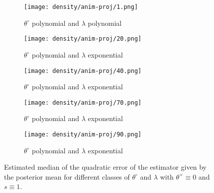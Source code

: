 \begin{figure}
\centering
\begin{subfigure}{.4\textwidth}
  \centering
  \texttt{[image: density/anim-proj/1.png]}
  \caption{$\theta^{\circ}$ polynomial and $\lambda$ polynomial}
  \label{fig3:sub1}
\end{subfigure}%
\begin{subfigure}{.4\textwidth}
  \centering
  \texttt{[image: density/anim-proj/20.png]}
  \caption{$\theta^{\circ}$ polynomial and $\lambda$ exponential}
  \label{fig3:sub2}
\end{subfigure}
\begin{subfigure}{.4\textwidth}
  \centering
  \texttt{[image: density/anim-proj/40.png]}
  \caption{$\theta^{\circ}$ polynomial and $\lambda$ exponential}
  \label{fig3:sub2}
\end{subfigure}
\begin{subfigure}{.4\textwidth}
  \centering
  \texttt{[image: density/anim-proj/70.png]}
  \caption{$\theta^{\circ}$ polynomial and $\lambda$ exponential}
  \label{fig3:sub2}
\end{subfigure}
\begin{subfigure}{.4\textwidth}
  \centering
  \texttt{[image: density/anim-proj/90.png]}
  \caption{$\theta^{\circ}$ polynomial and $\lambda$ exponential}
  \label{fig3:sub2}
\end{subfigure}
\caption{Estimated median of the quadratic error of the estimator given by the posterior mean for different classes of $\theta^{\circ}$ and $\lambda$ with $\theta^{\times} \equiv 0$ and $s \equiv 1$.}
\label{EQM}
\end{figure}






